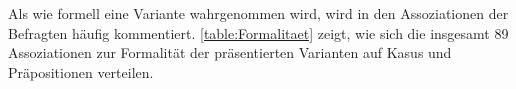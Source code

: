 Als wie formell eine Variante wahrgenommen wird, wird in den Assoziationen der Befragten häufig kommentiert.   
\autoref{table:Formalitaet} zeigt, wie sich die insgesamt 89 Assoziationen zur Formalität der präsentierten Varianten auf Kasus und Präpositionen verteilen. 

